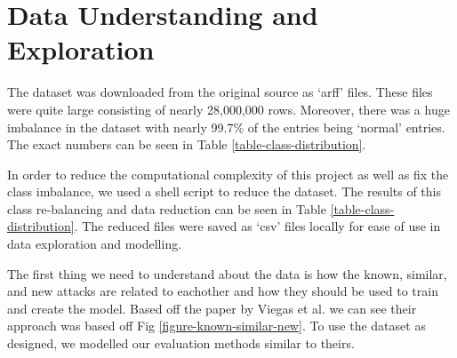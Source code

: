 
\section{Data Understanding and Exploration}
\label{data-understanding-and-exploation}
The dataset was downloaded from the original source as `arff' files. These files were quite large consisting of nearly 28,000,000 rows. Moreover, there was a huge imbalance in the dataset with nearly 99.7\% of the entries being `normal' entries. The exact numbers can be seen in Table \ref{table-class-distribution}.



In order to reduce the computational complexity of this project as well as fix the class imbalance, we used a shell script to reduce the dataset. The results of this class re-balancing and data reduction can be seen in Table \ref{table-class-distribution}. The reduced files were saved as `csv' files locally for ease of use in data exploration and modelling. 


The first thing we need to understand about the data is how the known, similar, and new attacks are related to eachother and how they should be used to train and create the model. Based off the paper by Viegas et al. we can see their approach was based off Fig \ref{figure-known-similar-new}.\cite{viegas2017toward} To use the dataset as designed, we modelled our evaluation methods similar to theirs.

